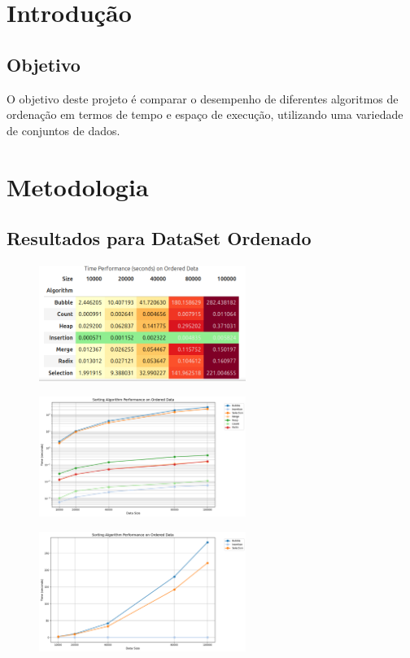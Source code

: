 \chapter{Introdução}
\section{Objetivo}
  O objetivo deste projeto é comparar o desempenho de diferentes algoritmos de
ordenação em termos de tempo e espaço de execução, utilizando uma variedade de
conjuntos de dados.


\chapter{Metodologia}
\section{Resultados para DataSet Ordenado}

\begin{figure}[H]
  \centering
  \includegraphics[width=0.6\textwidth]{images/order_table}
\end{figure}

\begin{figure}[H]
  \centering
  \includegraphics[width=0.6\textwidth]{images/all_algo_order}
\end{figure}

\begin{figure}[H]
  \centering
  \includegraphics[width=0.6\textwidth]{images/o2_order}
\end{figure}

